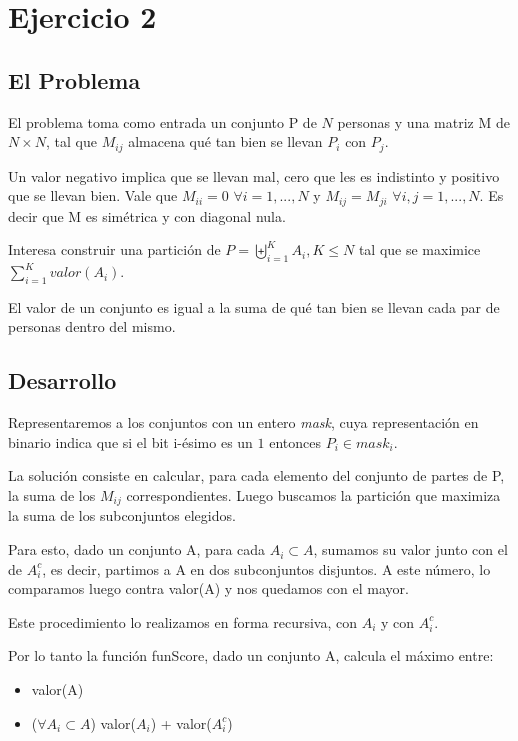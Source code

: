 \section{Ejercicio 2}

\subsection{El Problema}

El problema toma como entrada un conjunto P de $N$ personas y una matriz M de $N \times N$, tal que $M_{ij}$ almacena qu\'e tan bien se llevan $P_i$ con $P_j$.

Un valor negativo implica que se llevan mal, cero que les es indistinto y positivo que se llevan bien. Vale que $M_{ii} = 0$ $\forall i = 1,...,N$ y $M_{ij} = M_{ji}$  $\forall i,j = 1,...,N$. Es decir que M es sim\'etrica y con diagonal nula. 

Interesa construir una partici\'on de $P = \biguplus\limits_{i = 1}^{K} A_i, K \leq N$ tal que se maximice $\displaystyle\sum_{i = 1}^{K} valor(A_i)$.

El valor de un conjunto es igual a la suma de qu\'e tan bien se llevan cada par de personas dentro del mismo.

\subsection{Desarrollo}

Representaremos a los conjuntos con un entero \textit{mask}, cuya representaci\'on en binario indica que si el bit i-\'esimo es un $1$ entonces $P_i \in mask_i$.

La soluci\'on consiste en calcular, para cada elemento del conjunto de partes de P, la suma de los $M_{ij}$ correspondientes. Luego buscamos la partici\'on que maximiza la suma de los subconjuntos elegidos.

Para esto, dado un conjunto A, para cada $A_i \subset  A$, sumamos su valor junto con el de $A_i^c$, es decir, partimos a A en dos subconjuntos disjuntos. A este n\'umero, lo comparamos luego contra valor(A) y nos quedamos con el mayor.

Este procedimiento lo realizamos en forma recursiva, con $A_i$ y con $A_i^c$.

Por lo tanto la funci\'on funScore, dado un conjunto A, calcula el m\'aximo entre:

\begin{itemize}
	\item valor(A)
	\item ($\forall A_i \subset A$) valor($A_i$) + valor($A_i^c$)
\end{itemize}

